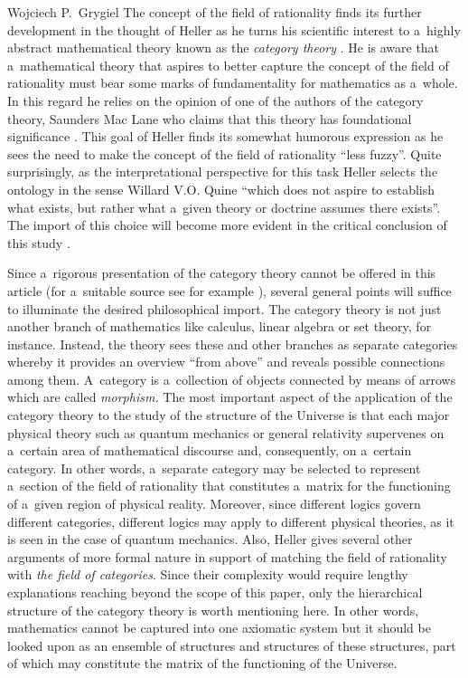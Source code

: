 \begin{artengenv}{Wojciech P.~Grygiel}
The concept of the field of rationality finds its further development in the thought of Heller as he turns his scientific interest to a~highly abstract mathematical theory known as the \textit{category theory}
\parencite[][]{heller_field_2014}. %
 He is aware that a~mathematical theory that aspires to better capture the concept of the field of rationality must bear some marks of fundamentality for mathematics as a~whole. In this regard he relies on the opinion of one of the authors of the category theory, Saunders Mac Lane who claims that this theory has foundational significance 
\parencite[][]{mac_lane_protean_1992}. %
 This goal of Heller finds its somewhat humorous expression as he sees the need to make the concept of the field of rationality ``less fuzzy''. Quite surprisingly, as the interpretational perspective for this task Heller selects the ontology in the sense Willard V.O. Quine ``which does not aspire to establish what exists, but rather what a~given theory or doctrine assumes there exists''. The import of this choice will become more evident in the critical conclusion of this study 
\parencite[][p.442]{heller_field_2014}.%


Since a~rigorous presentation of the category theory cannot be offered in this article (for a~suitable source see for example
\parencite[][]{simmons_introduction_2011}%
), several general points will suffice to illuminate the desired philosophical import. The category theory is not just another branch of mathematics like calculus, linear algebra or set theory, for instance. Instead, the theory sees these and other branches as separate categories whereby it provides an overview ``from above'' and reveals possible connections among them. A~category is a~collection of objects connected by means of arrows which are called \textit{morphism.} The most important aspect of the application of the category theory to the study of the structure of the Universe is that each major physical theory such as quantum mechanics or general relativity supervenes on a~certain area of mathematical discourse and, consequently, on a~certain category. In other words, a~separate category may be selected to represent a~section of the field of rationality that constitutes a~matrix for the functioning of a~given region of physical reality. Moreover, since different logics govern different categories, different logics may apply to different physical theories, as it is seen in the case of quantum mechanics. Also, Heller gives several other arguments of more formal nature in support of matching the field of rationality with \textit{the field of categories}. Since their complexity would require lengthy explanations reaching beyond the scope of this paper, only the hierarchical structure of the category theory is worth mentioning here. In other words, mathematics cannot be captured into one axiomatic system but it should be looked upon as an ensemble of structures and structures of these structures, part of which may constitute the matrix of the functioning of the Universe.


\end{artengenv}
